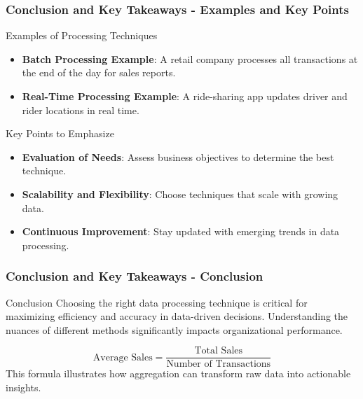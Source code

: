 \documentclass[aspectratio=169]{beamer}
\begin{document}
\begin{frame}[fragile]
  \frametitle{Conclusion and Key Takeaways - Examples and Key Points}
  \begin{block}{Examples of Processing Techniques}
    \begin{itemize}
      \item \textbf{Batch Processing Example}: A retail company processes all transactions at the end of the day for sales reports.
      \item \textbf{Real-Time Processing Example}: A ride-sharing app updates driver and rider locations in real time.
    \end{itemize}
  \end{block}
  
  \begin{block}{Key Points to Emphasize}
    \begin{itemize}
      \item \textbf{Evaluation of Needs}: Assess business objectives to determine the best technique.
      \item \textbf{Scalability and Flexibility}: Choose techniques that scale with growing data.
      \item \textbf{Continuous Improvement}: Stay updated with emerging trends in data processing.
    \end{itemize}
  \end{block}
\end{frame}

\begin{frame}[fragile]
  \frametitle{Conclusion and Key Takeaways - Conclusion}
  \begin{block}{Conclusion}
    Choosing the right data processing technique is critical for maximizing efficiency and accuracy in data-driven decisions. Understanding the nuances of different methods significantly impacts organizational performance.
  \end{block}
  
  \begin{equation}
    \text{Average Sales} = \frac{\text{Total Sales}}{\text{Number of Transactions}}
  \end{equation}
  This formula illustrates how aggregation can transform raw data into actionable insights.
\end{frame}
\end{document}
